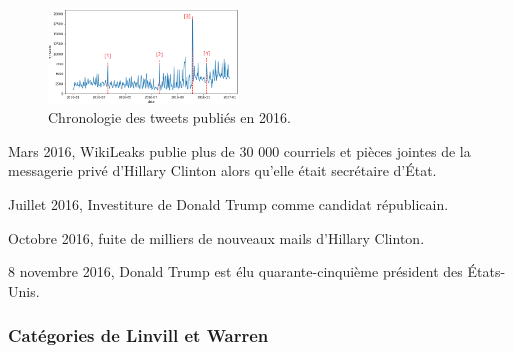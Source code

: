 \documentclass[twocolumn,10pt]{article}
\begin{document}
\begin{figure}[h]
\begin{center}
\caption{\label{fig:C2016}Chronologie des tweets publiés en 2016.}
\includegraphics[width=0.45\textwidth]{Ressources/2016_tweets.png}
\end{center}
\end{figure}

\begin{enumerate}[label={\color{red}[\theenumi]}]
\item Mars 2016, WikiLeaks publie plus de 30 000 courriels et pièces jointes de la messagerie privé d'Hillary Clinton alors qu'elle était secrétaire d'État.
\item Juillet 2016, Investiture de Donald Trump comme candidat républicain.
\item Octobre 2016, fuite de milliers de nouveaux mails d'Hillary Clinton.
\item 8 novembre 2016, Donald Trump est élu quarante-cinquième président des États-Unis. 
\end{enumerate}

\subsubsection{Catégories de Linvill et Warren}
\end{document}
